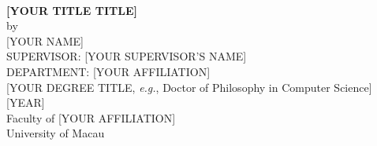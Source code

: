 %
%
%
%
%
\begin{titlepage}
    \addtolength{\hoffset}{0.5\evensidemargin-0.5\oddsidemargin} %
    \noindent%
    
    \begin{center}

        \large \textbf{   } \\[2.0cm]

        \begin{normalsize}
            \textbf{[YOUR TITLE TITLE]}\\[1.0cm]
            
            \small{by}\\[1.0cm]
            {[YOUR NAME]}\\[1.0cm]
            
            SUPERVISOR: {[YOUR SUPERVISOR'S NAME]} \\[3.0cm]
            
            DEPARTMENT: {[YOUR AFFILIATION]} \\[1.0cm]
            {[YOUR DEGREE TITLE, \textit{e.g.}, Doctor of Philosophy in Computer Science]} \\[1.0cm]

            {[YEAR]} \\[1.0cm]
            Faculty of {[YOUR AFFILIATION]} \\[1.0cm]
            University of Macau\\[1.0cm]
        \end{normalsize}
    
    \end{center}
\end{titlepage}
